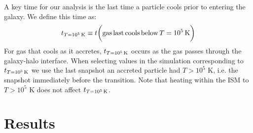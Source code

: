 \documentclass[fleqn,usenatbib]{mnras}
\newcommand{\tcon}{t_{T=10^5\,{\rm K}}}
\begin{document}
A key time for our analysis is the last time a particle cools prior to entering the galaxy. We define this time as:
\begin{equation}
    \tcon \equiv t \bigg( {\rm gas\,last\,cools\,below}\,T=10^5\,{\rm K} \bigg)
\end{equation}
For gas that cools as it accretes, $\tcon$ occurs as the gas passes through the galaxy-halo interface.
When selecting values in the simulation corresponding to $\tcon$ we use the last snapshot an accreted particle had $T > 10^5$ K, i.e. the snapshot immediately before the transition.
Note that heating within the ISM to $T > 10^5$ K does not affect $\tcon$.

\section{Results}
\label{s: results}

\label{s: characteristics}
\end{document}
